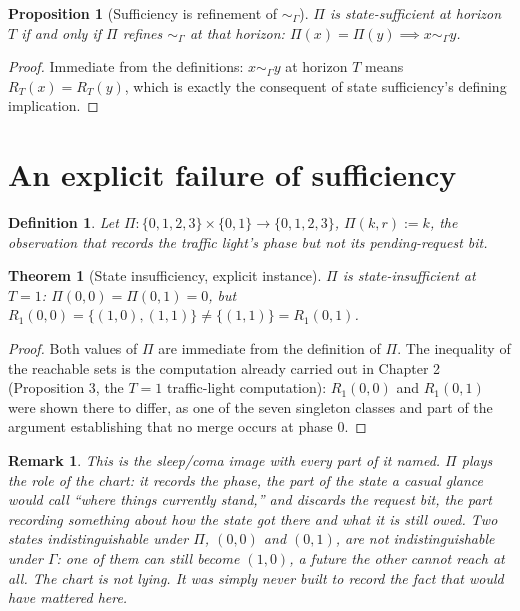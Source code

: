 \documentclass[11pt]{report}
\newtheorem{proposition}{Proposition}[chapter]
\newtheorem{theorem}{Theorem}[chapter]
\newtheorem{definition}{Definition}[chapter]
\newtheorem{remark}{Remark}[chapter]
\begin{document}
\begin{proposition}[Sufficiency is refinement of $\sim_\Gamma$]
$\Pi$ is state-sufficient at horizon $T$ if and only if $\Pi$ refines
$\sim_\Gamma$ at that horizon: $\Pi(x) = \Pi(y) \implies x \sim_\Gamma
y$.
\end{proposition}
\begin{proof}
Immediate from the definitions: $x \sim_\Gamma y$ at horizon $T$ means
$R_T(x) = R_T(y)$, which is exactly the consequent of state
sufficiency's defining implication.
\end{proof}

\section*{An explicit failure of sufficiency}

\begin{definition}
Let $\Pi : \{0,1,2,3\} \times \{0,1\} \to \{0,1,2,3\}$,
$\Pi(k,r) := k$, the observation that records the traffic light's
phase but not its pending-request bit.
\end{definition}

\begin{theorem}[State insufficiency, explicit instance]
\label{thm:insufficient}
$\Pi$ is state-insufficient at $T=1$: $\Pi(0,0) = \Pi(0,1) = 0$, but
$R_1(0,0) = \{(1,0),(1,1)\} \neq \{(1,1)\} = R_1(0,1)$.
\end{theorem}
\begin{proof}
Both values of $\Pi$ are immediate from the definition of $\Pi$. The
inequality of the reachable sets is the computation already carried
out in Chapter 2 (Proposition 3, the $T=1$ traffic-light computation):
$R_1(0,0)$ and $R_1(0,1)$ were shown there to differ, as one of the
seven singleton classes and part of the argument establishing that no
merge occurs at phase $0$.
\end{proof}

\begin{remark}
This is the sleep/coma image with every part of it named. $\Pi$ plays
the role of the chart: it records the phase, the part of the state a
casual glance would call ``where things currently stand,'' and
discards the request bit, the part recording something about how the
state got there and what it is still owed. Two states indistinguishable
under $\Pi$, $(0,0)$ and $(0,1)$, are not indistinguishable under
$\Gamma$: one of them can still become $(1,0)$, a future the other
cannot reach at all. The chart is not lying. It was simply never built
to record the fact that would have mattered here.
\end{remark}
\end{document}
